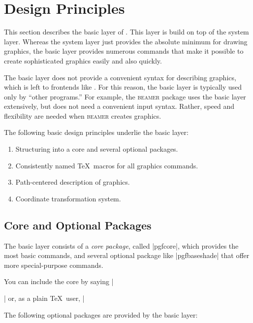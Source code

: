 %


\section{Design Principles}

This section describes the basic layer of \pgfname. This layer is
build on top of the system layer. Whereas the system layer just
provides the absolute minimum for drawing graphics, the basic
layer provides numerous commands that make it possible to create
sophisticated graphics easily and also quickly.

The basic layer does not provide a convenient syntax for describing
graphics, which is left to frontends like \tikzname. For this reason, the
basic layer is typically used only by ``other programs.'' For example,
the \textsc{beamer} package uses the basic layer extensively, but does
not need a convenient input syntax. Rather, speed and flexibility are
needed when \textsc{beamer} creates graphics.

The following basic design principles underlie the basic layer:
\begin{enumerate}
\item Structuring into a core and several optional packages.
\item Consistently named \TeX\ macros for all graphics commands.
\item Path-centered description of graphics.
\item Coordinate transformation system.
\end{enumerate}



\subsection{Core and Optional Packages}

The basic layer consists of a \emph{core package}, called |pgfcore|,
which provides the most basic commands, and several optional package
like |pgfbaseshade| that offer more special-purpose commands.

You can include the core by saying |\usepackage{pgfcore}| or, as a
plain \TeX\ user, |

The following optional packages are provided by the basic layer:


